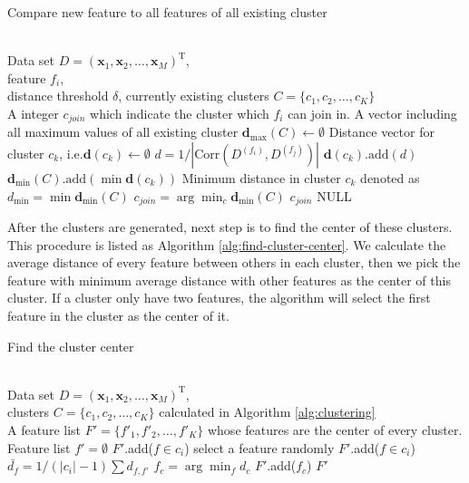 \documentclass[journal]{IEEEtran}
\begin{document}
\begin{algorithm}
\caption{Compare new feature to all features of all existing cluster}
\label{alg:compare-and-join}
\begin{algorithmic}[1]
\REQUIRE ~~\\
    Data set $D=(\bm{x}_1,\bm{x}_2,\ldots,\bm{x}_M)^\text{T}$, \\
    feature $f_i$, \\
    distance threshold $\delta$,
    currently existing clusters $C=\{c_1, c_2, \ldots, c_K\}$
\ENSURE ~~\\
    A integer $c_{join}$ which indicate the cluster which $f_i$ can join in.  
\STATE A vector including all maximum values of all existing cluster $\bm{d}_{\max}(C) \gets \emptyset$
    \STATE Distance vector for cluster $c_k$, i.e.$\bm{d}(c_k) \gets \emptyset$
        \STATE $d=1/|\text{Corr}(D^{(f_i)}, D^{(f_j)})|$
        \STATE $\bm{d}(c_k)\text{.add}(d)$
    \ENDFOR
    \STATE $\bm{d}_{\min}(C)\text{.add}(\min{\bm{d}(c_k)})$
\ENDFOR
\STATE Minimum distance in cluster $c_k$ denoted as $d_{\min}=\min{\bm{d}_{\min}(C)}$
    \STATE $c_{join}=\arg\min_c{\bm{d}_{\min}(C)}$
    \RETURN $c_{join}$
\ELSE
    \RETURN NULL
\ENDIF
\end{algorithmic}
\end{algorithm}

After the clusters are generated, next step is to find the center of these clusters. This procedure is listed as Algorithm \ref{alg:find-cluster-center}. We calculate the average distance of every feature between others in each cluster, then we pick the feature with minimum average distance with other features as the center of this cluster. If a cluster only have two features, the algorithm will select the first feature in the cluster as the center of it.

\begin{algorithm}
\caption{Find the cluster center}
\label{alg:find-cluster-center}
\begin{algorithmic}[1]
\REQUIRE ~~\\
    Data set $D=(\bm{x}_1,\bm{x}_2,\ldots,\bm{x}_M)^\text{T}$, \\
    clusters $C=\{c_1, c_2, \ldots, c_K\}$ calculated in Algorithm \ref{alg:clustering}
\ENSURE ~~\\
    A feature list $F'=\{f'_1, f'_2, \ldots, f'_K\}$ whose features are the center of every cluster. 
\STATE Feature list $f'=\emptyset$
        \STATE $F'$.add($f \in c_i$)
            \STATE select a feature randomly
            \STATE $F'$.add($f \in c_i$)
    \ELSE
            \STATE $\bar{d_f}=1/(|c_i|-1)\sum d_{f, f'}$
        \ENDFOR
        \STATE $f_c=\arg\min_f d_c$
        \STATE $F'$.add($f_c$)
    \ENDIF
\ENDFOR
\RETURN $F'$
\end{algorithmic}
\end{algorithm}
\end{document}
